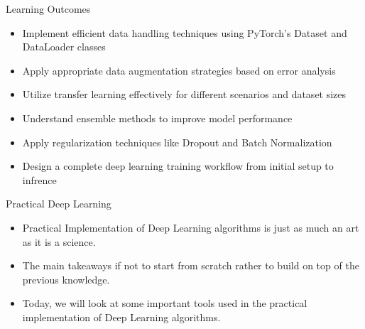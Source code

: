 \begin{frame}{Learning Outcomes}
\begin{itemize}
    \item Implement efficient data handling techniques using PyTorch's Dataset and DataLoader classes
    \item Apply appropriate data augmentation strategies based on error analysis
    \item Utilize transfer learning effectively for different scenarios and dataset sizes
    \item Understand ensemble methods to improve model performance
    \item Apply regularization techniques like Dropout and Batch Normalization
    \item Design a complete deep learning training workflow from initial setup to infrence
\end{itemize}
\end{frame}

\begin{frame}{Practical Deep Learning}
\begin{itemize}
    \item Practical Implementation of Deep Learning algorithms is just as much an art as it is a science.
    \item The main takeaways if not to start from scratch rather to build on top of the previous knowledge.
    \item Today, we will look at some important tools used in the practical implementation of Deep Learning algorithms.
\end{itemize}
\end{frame} 